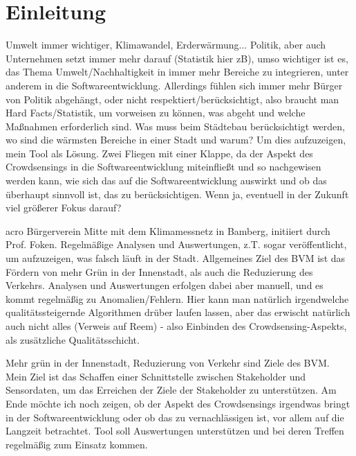 \chapter{Einleitung} %
Umwelt immer wichtiger, Klimawandel, Erderwärmung... Politik, aber auch Unternehmen setzt immer mehr darauf (Statistik hier zB), umso wichtiger ist es, das Thema Umwelt/Nachhaltigkeit 
in immer mehr Bereiche zu integrieren, unter anderem in die Softwareentwicklung. Allerdings fühlen sich immer mehr Bürger von Politik abgehängt, oder nicht 
respektiert/berücksichtigt, also braucht man Hard Facts/Statistik, um vorweisen zu können, was abgeht und welche Maßnahmen erforderlich sind. Was muss beim Städtebau berücksichtigt werden, wo sind die wärmsten 
Bereiche in einer Stadt und warum? Um dies aufzuzeigen, mein Tool als Lösung. Zwei Fliegen mit einer Klappe, da der Aspekt des Crowdsensings in die Softwareentwicklung miteinfließt und so nachgewisen werden kann, wie sich das
auf die Softwareentwicklung auswirkt und ob das überhaupt sinnvoll ist, das zu berücksichtigen. Wenn ja, eventuell in der Zukunft viel größerer Fokus darauf?

\ac{acro} Bürgerverein Mitte mit dem Klimamessnetz in Bamberg, initiiert durch Prof. Foken. Regelmäßige Analysen und Auswertungen, z.T. sogar veröffentlicht, um aufzuzeigen, was falsch läuft in der Stadt. Allgemeines Ziel des BVM ist das Fördern von mehr Grün in der Innenstadt, als auch die 
Reduzierung des Verkehrs. Analysen und Auswertungen erfolgen dabei aber manuell, und 
es kommt regelmäßig zu Anomalien/Fehlern. Hier kann man natürlich irgendwelche qualitätssteigernde Algorithmen drüber laufen lassen, aber das erwischt natürlich auch nicht alles (Verweis auf Reem) - also Einbinden des Crowdsensing-Aspekts, als zusätzliche Qualitätsschicht.

Mehr grün in der Innenstadt, Reduzierung von Verkehr sind Ziele des BVM. Mein Ziel ist das Schaffen einer Schnittstelle zwischen Stakeholder und Sensordaten, um das Erreichen der Ziele der Stakeholder zu unterstützen. Am Ende möchte ich noch zeigen, ob der Aspekt des Crowdsensings irgendwas bringt in der Softwareentwicklung oder ob
das zu vernachlässigen ist, vor allem auf die Langzeit betrachtet. Tool soll Auswertungen unterstützen und bei deren Treffen regelmäßig zum Einsatz kommen.